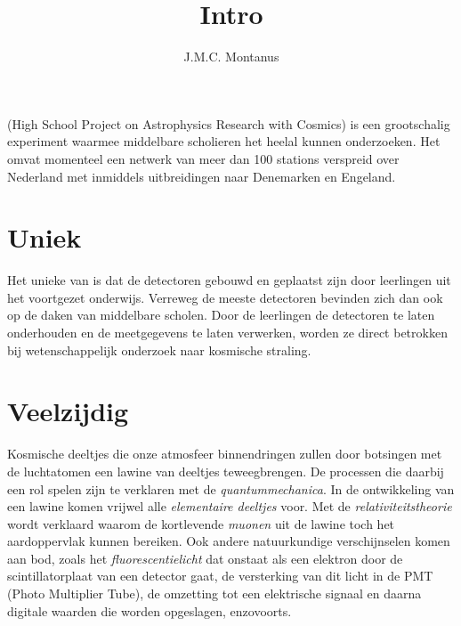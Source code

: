 

\title{Intro}
\author{J.M.C. Montanus}



\maketitle

\section{\hisparc}

\hisparc (High School Project on Astrophysics Research with Cosmics) is
een grootschalig experiment waarmee middelbare scholieren het heelal
kunnen onderzoeken. Het omvat momenteel een netwerk van meer dan 100
stations verspreid over Nederland met inmiddels uitbreidingen naar
Denemarken en Engeland. 


\section{Uniek}

Het unieke van \hisparc is dat de detectoren gebouwd en geplaatst zijn
door leerlingen uit het voortgezet onderwijs. Verreweg de
meeste detectoren bevinden zich dan ook op de daken van middelbare
scholen. Door de leerlingen de detectoren te laten onderhouden en de
meetgegevens te laten verwerken, worden ze direct betrokken bij
wetenschappelijk onderzoek naar kosmische straling. 


\section{Veelzijdig}

Kosmische deeltjes die onze atmosfeer binnendringen zullen door
botsingen met de luchtatomen een lawine van deeltjes teweegbrengen. De
processen die daarbij een rol spelen zijn te verklaren met de
\emph{quantummechanica}. In de ontwikkeling van een lawine komen vrijwel
alle \emph{elementaire deeltjes} voor. Met de
\emph{relativiteitstheorie} wordt verklaard waarom de kortlevende
\emph{muonen} uit de lawine toch het aardoppervlak kunnen bereiken. Ook
andere natuurkundige verschijnselen komen aan bod, zoals het
\emph{fluorescentielicht} dat onstaat als een elektron door de
scintillatorplaat van een \hisparc detector gaat, de versterking van dit
licht in de PMT (Photo Multiplier Tube), de omzetting tot een
elektrische signaal en daarna digitale waarden die worden opgeslagen,
enzovoorts.      



